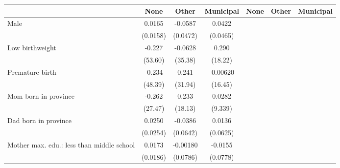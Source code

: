 {
\def\sym#1{\ifmmode^{#1}\else\(^{#1}\)\fi}
\begin{tabular}{l*{6}{c}}
\toprule
                    &\multicolumn{1}{c}{None}&\multicolumn{1}{c}{Other}&\multicolumn{1}{c}{Municipal}&\multicolumn{1}{c}{None}&\multicolumn{1}{c}{Other}&\multicolumn{1}{c}{Municipal}\\
\midrule
Male                &      0.0165         &     -0.0587         &      0.0422         &                     &                     &                     \\
                    &    (0.0158)         &    (0.0472)         &    (0.0465)         &                     &                     &                     \\
\addlinespace
Low birthweight     &      -0.227         &     -0.0628         &       0.290         &                     &                     &                     \\
                    &     (53.60)         &     (35.38)         &     (18.22)         &                     &                     &                     \\
\addlinespace
Premature birth     &      -0.234         &       0.241         &    -0.00620         &                     &                     &                     \\
                    &     (48.39)         &     (31.94)         &     (16.45)         &                     &                     &                     \\
\addlinespace
Mom born in province&      -0.262         &       0.233         &      0.0282         &                     &                     &                     \\
                    &     (27.47)         &     (18.13)         &     (9.339)         &                     &                     &                     \\
\addlinespace
Dad born in province&      0.0250         &     -0.0386         &      0.0136         &                     &                     &                     \\
                    &    (0.0254)         &    (0.0642)         &    (0.0625)         &                     &                     &                     \\
\addlinespace
Mother max. edu.: less than middle school&      0.0173         &    -0.00180         &     -0.0155         &                     &                     &                     \\
                    &    (0.0186)         &    (0.0786)         &    (0.0778)         &                     &                     &                     \\

\end{tabular}}
